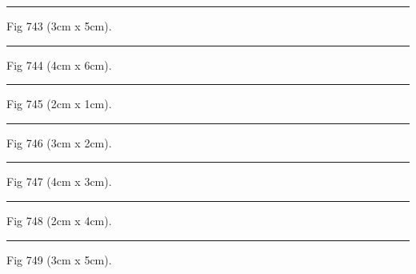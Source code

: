 \documentclass[a4paper,11pt]{article}
\begin{document}
\begin{swarmwrap}%
  \begin{minipage}[t]{3cm}
    \centering
    \rule{\linewidth}{5cm}
    {\footnotesize Fig 743 (3cm x 5cm).}
  \end{minipage}%
\end{swarmwrap}%
\swarmwrapnext
\lipsum[143]%

\begin{swarmwrap}%
  \begin{minipage}[t]{4cm}
    \centering
    \rule{\linewidth}{6cm}
    {\footnotesize Fig 744 (4cm x 6cm).}
  \end{minipage}%
\end{swarmwrap}%
\swarmwrapnext
\lipsum[144]%

\begin{swarmwrap}%
  \begin{minipage}[t]{2cm}
    \centering
    \rule{\linewidth}{1cm}
    {\footnotesize Fig 745 (2cm x 1cm).}
  \end{minipage}%
\end{swarmwrap}%
\swarmwrapnext
\lipsum[145]%

\begin{swarmwrap}%
  \begin{minipage}[t]{3cm}
    \centering
    \rule{\linewidth}{2cm}
    {\footnotesize Fig 746 (3cm x 2cm).}
  \end{minipage}%
\end{swarmwrap}%
\swarmwrapnext
\lipsum[146]%

\begin{swarmwrap}%
  \begin{minipage}[t]{4cm}
    \centering
    \rule{\linewidth}{3cm}
    {\footnotesize Fig 747 (4cm x 3cm).}
  \end{minipage}%
\end{swarmwrap}%
\swarmwrapnext
\lipsum[147]%

\begin{swarmwrap}%
  \begin{minipage}[t]{2cm}
    \centering
    \rule{\linewidth}{4cm}
    {\footnotesize Fig 748 (2cm x 4cm).}
  \end{minipage}%
\end{swarmwrap}%
\swarmwrapnext
\lipsum[148]%

\begin{swarmwrap}%
  \begin{minipage}[t]{3cm}
    \centering
    \rule{\linewidth}{5cm}
    {\footnotesize Fig 749 (3cm x 5cm).}
  \end{minipage}%
\end{swarmwrap}%
\swarmwrapnext
\lipsum[149]%
\end{document}
